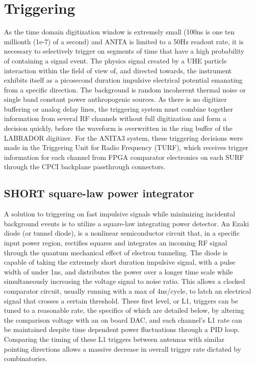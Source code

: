 		
\section{Triggering}
	As the time domain digitization window is extremely small (100ns is one ten millionth (1e-7) of a second) and ANITA is limited to a 50Hz readout rate, it is necessary to selectively trigger on segments of time that have a high probability of containing a signal event.  The physics signal created by a UHE particle interaction within the field of view of, and directed towards, the instrument exhibits itself as a picosecond duration impulsive electrical potential emanating from a specific direction.  The background is random incoherent thermal noise or single band constant power anthropogenic sources.  As there is no digitizer buffering or analog delay lines, the triggering system must combine together information from several RF channels without full digitization and form a decision quickly, before the waveform is overwritten in the ring buffer of the LABRADOR digitizer.  For the ANITA3 system, these triggering decisions were made in the Triggering Unit for Radio Frequency (TURF), which receives trigger information for each channel from FPGA comparator electronics on each SURF through the CPCI backplane passthrough connectors.
	
	\subsection{SHORT square-law power integrator}
		A solution to triggering on fast impulsive signals while minimizing incidental background events is to utilize a square-law integrating power detector.  An Ezaki diode (or tunnel diode), is a nonlinear semiconductor circuit that, in a specific input power region, rectifies squares and integrates an incoming RF signal through the quantum mechanical effect of electron tunneling.  The diode is capable of taking the extremely short duration impulsive signal, with a pulse width of under 1ns, and distributes the power over a longer time scale while simultaneously increasing the voltage signal to noise ratio.  This allows a clocked comparator circuit, usually running with a max of 4ns/cycle, to latch an electrical signal that crosses a certain threshold.  These first level, or L1, triggers can be tuned to a reasonable rate, the specifics of which are detailed below, by altering the comparison voltage with an on board DAC, and each channel's L1 rate can be maintained despite time dependent power fluctuations through a PID loop.  Comparing the timing of these L1 triggers between antennas with similar pointing directions allows a massive decrease in overall trigger rate dictated by combinatorics.
		
